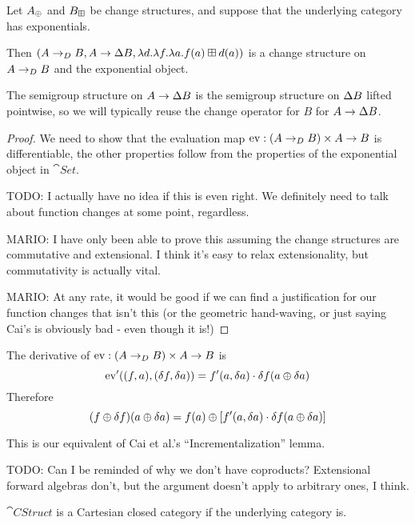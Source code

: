 \begin{prop}[Exponentials]
  Let $A_\oplus$ and $B_\boxplus$ be change structures, and suppose that the
  underlying category has exponentials.

  Then $(A \rightarrow_{D} B,A
    \rightarrow \Delta B,\lambda d. \lambda f. \lambda a. f(a) \boxplus
    d(a))$ is a change structure on $A \rightarrow_{D} B$ and the exponential object.

  The semigroup structure on $A \rightarrow \Delta B$ is the semigroup
  structure on $\Delta B$ lifted pointwise, so we will typically reuse the
  change operator for $B$ for $A \rightarrow \Delta B$.
\end{prop}
\begin{proof}
  We need to show that the evaluation map $\operatorname{ev}: (A \rightarrow_{D} B) \times A
  \rightarrow B$ is differentiable, the other properties follow from the
  properties of the exponential object in $\cat{Set}$.

  TODO: I actually have no idea if this is even right. We definitely need to
  talk about function changes at some point, regardless.

  MARIO: I have only been able to prove this assuming the change structures are
  commutative and extensional. I think it's easy to relax extensionality, but
  commutativity is actually vital.

  MARIO: At any rate, it would be good if we can find a justification for our
  function changes that isn't this (or the geometric hand-waving, or just saying
  Cai's is obviously bad - even though it is!)
\end{proof}

\begin{prop}[Incrementalization]
\label{prop:incrementalization}
  The derivative of $\operatorname{ev}: (A \rightarrow_{D} B) \times A \rightarrow B$ is 
  $$\operatorname{ev}'((f, a), (\delta f, \delta a)) = f'(a, \delta a) \cdot \delta f(a \oplus \delta a)$$
  Therefore 
  $$(f \oplus \delta f)(a \oplus \delta a) = f(a) \oplus \left[f'(a,
    \delta a) \cdot \delta f(a \oplus \delta a) \right]$$
\end{prop}

This is our equivalent of Cai et al.'s ``Incrementalization'' lemma.

TODO: Can I be reminded of why we don't have coproducts? Extensional forward algebras
don't, but the argument doesn't apply to arbitrary ones, I think.

\begin{thm}
  $\cat{CStruct}$ is a Cartesian closed category if the underlying category is.
\end{thm}

